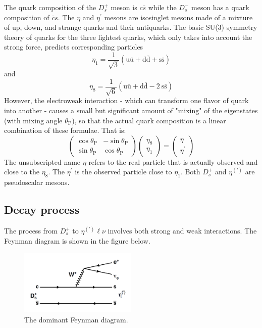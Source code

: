 The quark composition of the $D_{s}^{+}$ meson is $c\bar{s}$ while the $D_{s}^{-}$ meson has a quark composition of $\bar{c}s$. The $\eta$ and $\eta^{\prime}$ mesons are isosinglet mesons made of a mixture of up, down, and strange quarks and their antiquarks. The basic SU(3) symmetry theory of quarks for the three lightest quarks, which only takes into account the strong force, predicts corresponding particles   
\begin{equation}
\eta_1=\frac{1}{\sqrt{3}}(\mathrm{u} \overline{\mathrm{u}}+\mathrm{d} \overline{\mathrm{d}}+\mathrm{s} \overline{\mathrm{s}})
\end{equation}
and
\begin{equation}
\eta_8=\frac{1}{\sqrt{6}}(\mathrm{u} \overline{\mathrm{u}}+\mathrm{d} \overline{\mathrm{d}}-2 \mathrm{~s} \overline{\mathrm{s}})
\end{equation}
However, the electroweak interaction - which can transform one flavor of quark into another - causes a small but significant amount of "mixing" of the eigenstates (with mixing angle $\theta_{\mathrm{P}}$), so that the actual quark composition is a linear combination of these formulae. That is:
\begin{equation}
\left(\begin{array}{cr}
\cos \theta_{\mathrm{P}} & -\sin \theta_{\mathrm{P}} \\
\sin \theta_{\mathrm{P}} & \cos \theta_{\mathrm{P}}
\end{array}\right)\left(\begin{array}{l}
\eta_8 \\
\eta_1
\end{array}\right)=\left(\begin{array}{c}
\eta \\
\eta^{\prime}
\end{array}\right)
\end{equation}
The unsubscripted name $\eta$ refers to the real particle that is actually observed and close to the $\eta_8$. The $\eta^{\prime}$ is the observed particle close to $\eta_1$. Both $D_{s}^{+}$ and $\eta^{(\prime)}$ are pseudoscalar mesons.



\subsection{Decay process}
The process from \( D_{s}^{+} \) to \( \eta^{(\prime)} \ell \nu \) involves both strong and weak interactions. The Feynman diagram is shown in the figure below.


\begin{figure}[!hpt]\centering
    \includegraphics[width=0.5\textwidth]{image/diagram.png}
    \caption{The dominant Feynman diagram.}
    \label{fig:diagram1}
\end{figure}

